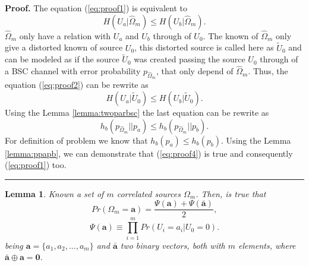 \documentclass[a4paper,10pt]{article}
\newtheorem{mylemma}[mytheorem]{Lemma}
\newenvironment{myproof}[1][Proof]{\textbf{#1.} }{\ \rule{0.5em}{0.5em}}
\begin{document}
\begin{myproof}
\label{proof:minimo}
The equation (\ref{eq:proof1}) is equivalent to
\begin{equation}\label{eq:proof2}
 H( U_{a}| \hat{\Omega}_{m}) \leq H(U_b| \hat{\Omega}_{m} ).
\end{equation} 
$\hat{\Omega}_{m}$  only have a relation with $U_a$ and $U_b$ through of $U_0$. The
known of $\hat{\Omega}_{m}$ only give a distorted known of source $U_0$, this
distorted source is called here as $\tilde{U}_0$ and can be modeled as
 if the source $\tilde{U}_0$ was created passing the source $U_0$ through of
a BSC channel with error probability $p_{\hat{\Omega}_{m}}$, that only depend of 
$\hat{\Omega}_{m}$. Thus, the equation (\ref{eq:proof2}) can be rewrite as 
\begin{equation}\label{eq:proof3}
 H( U_{a}| \tilde{U}_0) \leq H(U_b| \tilde{U}_0 ).
\end{equation} 
Using the Lemma \ref{lemma:twoparbsc} the last equation can be rewrite as
\begin{equation}\label{eq:proof4}
h_b( p_{\hat{\Omega}_{m}}||p_{a} ) \leq h_b( p_{\hat{\Omega}_{m}}||p_{b} ).
\end{equation} 
For definition of problem we know that $h_b(p_a) \leq h_b(p_b)$. Using the 
Lemma \ref{lemma:ppapb}, we can demonstrate that (\ref{eq:proof4}) is true
and consequently (\ref{eq:proof1}) too. 
\end{myproof}
\begin{mdframed}[style=MDFStyGrayScreen]
\begin{mylemma}
 \label{lemm:PrA}
Known a set of $m$ correlated  sources  $\Omega_m$. Then, is true that
\begin{equation}\label{eq:PA}
Pr(\Omega_m=\mathbf{a})=\frac{ \Psi(\mathbf{a}) + \Psi(\mathbf{\bar{a}}) }{2},
\end{equation}
\begin{equation}\label{eq:PAequiv}
\Psi(\mathbf{a}) \equiv \prod \limits_{i=1}^{m}{Pr(U_i=a_i|U_0=0)}.
\end{equation}
being $\mathbf{a}=\{a_1, a_2, ..., a_m\}$ and $\mathbf{\bar{a}}$ two 
binary vectors, both with $m$ elements, where $\mathbf{\bar{a}}\oplus \mathbf{a}=\mathbf{0}$. 
\end{mylemma}
\end{mdframed}
\end{document}
